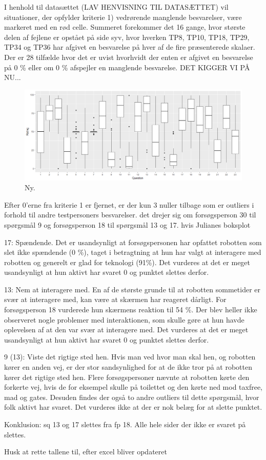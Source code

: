I henhold til datasættet (LAV HENVISNING TIL DATASÆTTET) vil situationer, der opfylder kriterie 1) vedrørende manglende besvarelser, være markeret med en rød celle. Summeret forekommer det 16 gange, hvor største delen af fejlene er opstået på side syv, hvor hverken TP8, TP10, TP18, TP29, TP34 og TP36 har afgivet en besvarelse på hver af de fire præsenterede skalaer. \blankline
%
Der er 28 tilfælde hvor det er uvist hvorhvidt der enten er afgivet en besvarelse på 0 \% eller om 0 \% afspejler en manglende besvarelse. DET KIGGER VI PÅ NU... 
%
\begin{figure}[H]
\centering
\includegraphics[width = \textwidth]{Figure/DatabehandlingSkalaer/Boksplot} 
\caption{Ny.}
\label{fig:Boxplot0er}
\end{figure}
\noindent
%

Efter 0'erne fra kriterie 1 er fjernet, er der kun 3 nuller tilbage som er outliers i forhold til andre testpersoners besvarelser. det drejer sig om forsøgsperson 30 til spørgsmål 9 og forsøgsperson 18 til spørgsmål 13 og 17. 
hvis Julianes boksplot

17: Spændende. Det er usandsynligt at forsøgspersonen har opfattet robotten som slet ikke spændende (0 \%), taget i betragtning at hun har valgt at interagere med robotten og generelt er glad for teknologi (91\%). Det vurderes at det er meget usandsynligt at hun aktivt har svaret 0 og punktet slettes derfor.

13: Nem at interagere med. En af de største grunde til at robotten sommetider er svær at interagere med, kan være at skærmen har reageret dårligt. For forsøgsperson 18 vurderede hun skærmens reaktion til 54 \%. Der blev heller ikke observeret nogle problemer med interaktionen, som skulle gøre at hun havde oplevelsen af at den var svær at interagere med. Det vurderes at det er meget usandsynligt at hun aktivt har svaret 0 og punktet slettes derfor.

9 (13): Viste det rigtige sted hen. Hvis man ved hvor man skal hen, og robotten kører en anden vej, er der stor sandsynlighed for at de ikke tror på at robotten kører det rigtige sted hen. Flere forsøgspersoner nævnte at robotten kørte den forkerte vej, hvis de for eksempel skulle på toilettet og den kørte ned mod taxfree, mad og gates. Desuden findes der også to andre outliers til dette spørgsmål, hvor folk aktivt har svaret. Det vurderes ikke at der er nok belæg for at slette punktet.

Konklusion: sq 13 og 17 slettes fra fp 18. Alle hele sider der ikke er svaret på slettes. 

Husk at rette tallene til, efter excel bliver opdateret


